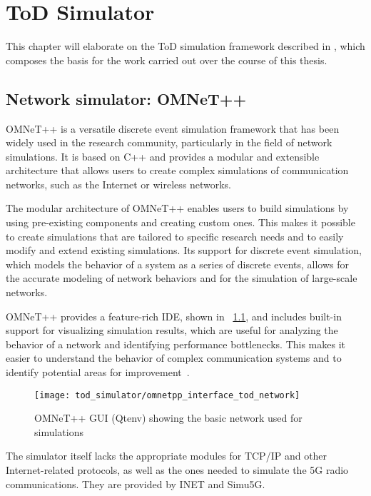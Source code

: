 \chapter{ToD Simulator}
\label{chap:tod_simulator}
This chapter will elaborate on the ToD simulation framework described in \cite{valeriopaper}, which composes the basis for the work carried out over the course of this thesis.

\section{Network simulator: OMNeT++}    
OMNeT++ is a versatile discrete event simulation framework that has been widely used in the research community, particularly in the field of network simulations. It is based on C++ and provides a modular and extensible architecture that allows users to create complex simulations of communication networks, such as the Internet or wireless networks.

The modular architecture of OMNeT++ enables users to build simulations by using pre-existing components and creating custom ones. This makes it possible to create simulations that are tailored to specific research needs and to easily modify and extend existing simulations. Its support for discrete event simulation, which models the behavior of a system as a series of discrete events, allows for the accurate modeling of network behaviors and for the simulation of large-scale networks.

OMNeT++ provides a feature-rich IDE, shown in \figurename~\ref{fig:omnetpp_interface_tod_network}, and includes built-in support for visualizing simulation results, which are useful for analyzing the behavior of a network and identifying performance bottlenecks. This makes it easier to understand the behavior of complex communication systems and to identify potential areas for improvement~\cite{OmnetVarga2010}.

\begin{figure}[t]
    \centering
    \texttt{[image: tod\_simulator/omnetpp\_interface\_tod\_network]}
    \caption{OMNeT++ GUI (Qtenv) showing the basic network used for simulations}
    \label{fig:omnetpp_interface_tod_network}
\end{figure}

The simulator itself lacks the appropriate modules for TCP/IP and other Internet-related protocols, as well as the ones needed to simulate the 5G radio communications. They are provided by INET and Simu5G.


